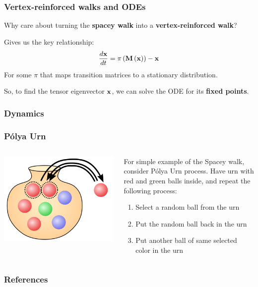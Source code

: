 \documentclass{beamer}
\begin{document}
\begin{frame}
  \frametitle{Vertex-reinforced walks and ODEs}
  Why care about turning the \textbf{spacey walk} into a \textbf{vertex-reinforced walk}?
  \begin{block}{}
    Gives us the key relationship:
    \[ \frac{d{\bf x}}{dt} = \pi\left({\bf M}\left({\bf x}\right)\right) - {\bf x} \]
    For some $\pi$ that maps transition matrices to a stationary distribution.
  \end{block}
  So, to find the tensor eigenvector ${\bf x}$, we can solve the ODE for its \textbf{fixed points}.
\end{frame}


\begin{frame}
  \frametitle{Dynamics}
\end{frame}


\begin{frame}
  \frametitle{P\'{o}lya Urn}
  \begin{columns}
    \begin{column}{0.4\linewidth}
      \centering
      \includegraphics[width=\linewidth]{images/polya.png}
    \end{column}
    \begin{column}{0.6\linewidth}
      For simple example of the Spacey walk, consider P\'{o}lya Urn process.  Have urn with red and green balls inside, and repeat the following process:
      \begin{enumerate}
      \item Select a random ball from the urn
      \item Put the random ball back in the urn
      \item Put another ball of same selected color in the urn
      \end{enumerate}
    \end{column}
  \end{columns}
\end{frame}

\begin{frame}
\frametitle{References}
\nocite*{}


\end{frame}
\end{document}
